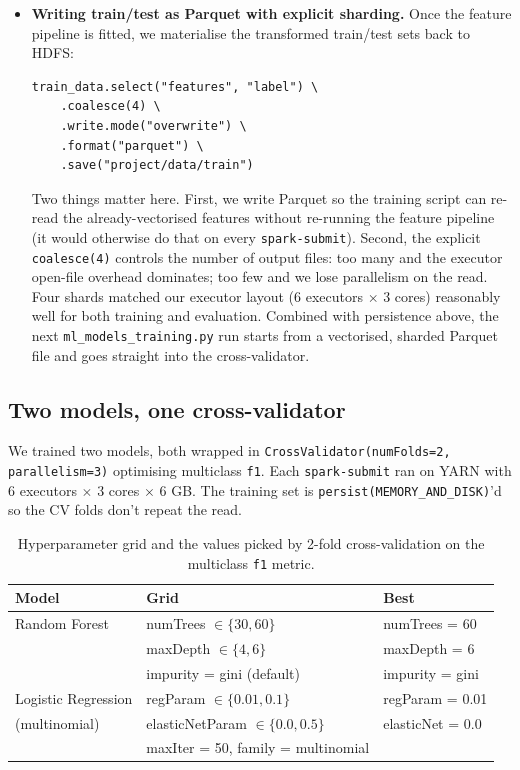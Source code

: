 \documentclass[11pt,a4paper]{article}
\begin{document}
\begin{itemize}[leftmargin=2em]
    \item \textbf{Writing train/test as Parquet with explicit sharding.}
    Once the feature pipeline is fitted, we materialise the transformed
    train/test sets back to HDFS:
    \begin{lstlisting}
train_data.select("features", "label") \
    .coalesce(4) \
    .write.mode("overwrite") \
    .format("parquet") \
    .save("project/data/train")
    \end{lstlisting}
    Two things matter here. First, we write Parquet so the training script
    can re-read the already-vectorised features without re-running the
    feature pipeline (it would otherwise do that on every \texttt{spark-submit}).
    Second, the explicit \texttt{coalesce(4)} controls the number of output
    files: too many and the executor open-file overhead dominates; too few
    and we lose parallelism on the read. Four shards matched our executor
    layout (6 executors $\times$ 3 cores) reasonably well for both training
    and evaluation. Combined with persistence above, the next
    \texttt{ml\_models\_training.py} run starts from a vectorised, sharded
    Parquet file and goes straight into the cross-validator.
\end{itemize}

\subsection{Two models, one cross-validator}

We trained two models, both wrapped in \texttt{CrossValidator(numFolds=2,
parallelism=3)} optimising multiclass \texttt{f1}. Each
\texttt{spark-submit} ran on YARN with 6 executors $\times$ 3 cores
$\times$ 6 GB. The training set is \texttt{persist(MEMORY\_AND\_DISK)}'d
so the CV folds don't repeat the read.

\begin{table}[H]
\centering
\small
\begin{tabular}{lll}
\toprule
\textbf{Model} & \textbf{Grid} & \textbf{Best} \\
\midrule
Random Forest & numTrees $\in \{30, 60\}$ & numTrees = 60 \\
              & maxDepth $\in \{4, 6\}$   & maxDepth = 6 \\
              & impurity = gini (default) & impurity = gini \\
\midrule
Logistic Regression & regParam $\in \{0.01, 0.1\}$           & regParam = 0.01 \\
(multinomial)       & elasticNetParam $\in \{0.0, 0.5\}$     & elasticNet = 0.0 \\
                    & maxIter = 50, family = multinomial     &  \\
\bottomrule
\end{tabular}
\caption{Hyperparameter grid and the values picked by 2-fold cross-validation
on the multiclass \texttt{f1} metric.}
\end{table}
\end{document}
